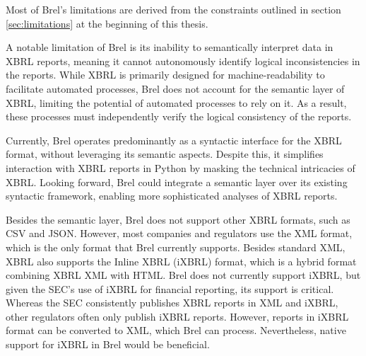 Most of Brel's limitations are derived from the constraints outlined in section \ref{sec:limitations} at the beginning of this thesis.

A notable limitation of Brel is its inability to semantically interpret data in XBRL reports,
meaning it cannot autonomously identify logical inconsistencies in the reports.
While XBRL is primarily designed for machine-readability to facilitate automated processes,
Brel does not account for the semantic layer of XBRL, limiting the potential of automated processes to rely on it.
As a result, these processes must independently verify the logical consistency of the reports.

Currently, Brel operates predominantly as a syntactic interface for the XBRL format, without leveraging its semantic aspects.
Despite this, it simplifies interaction with XBRL reports in Python by masking the technical intricacies of XBRL.
Looking forward, Brel could integrate a semantic layer over its existing syntactic framework, enabling more sophisticated analyses of XBRL reports.

Besides the semantic layer, Brel does not support other XBRL formats, such as CSV and JSON.
However, most companies and regulators use the XML format, which is the only format that Brel currently supports.
Besides standard XML, XBRL also supports the Inline XBRL (iXBRL) format, 
which is a hybrid format combining XBRL XML with HTML.
Brel does not currently support iXBRL, but given the SEC's use of iXBRL for financial reporting, its support is critical.
Whereas the SEC consistently publishes XBRL reports in XML and iXBRL, other regulators often only publish iXBRL reports.
However, reports in iXBRL format can be converted to XML, which Brel can process.
Nevertheless, native support for iXBRL in Brel would be beneficial.

